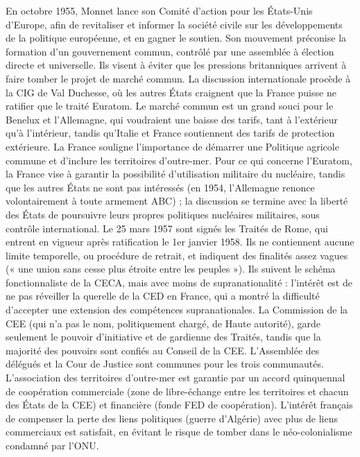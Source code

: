 \documentclass{report}%
\begin{document}
En octobre 1955, Monnet lance son Comité d’action pour les États-Unis d’Europe, afin de revitaliser et informer la société civile sur les développements de la politique européenne, et en gagner le soutien. Son mouvement préconise la formation d’un gouvernement commun, contrôlé par une assemblée à élection directe et universelle. Ils visent à éviter que les pressions britanniques arrivent à faire tomber le projet de marché commun.
La discussion internationale procède à la CIG de Val Duchesse, où les autres États craignent que la France puisse ne ratifier que le traité Euratom. Le marché commun est un grand souci pour le Benelux et l’Allemagne, qui voudraient une baisse des tarifs, tant à l'extérieur qu'à l'intérieur, tandis qu'Italie et France soutiennent des tarifs de protection extérieure. La France souligne l’importance de démarrer une Politique agricole commune et d’inclure les territoires d’outre-mer. Pour ce qui concerne l’Euratom, la France vise à garantir la possibilité d’utilisation militaire du nucléaire, tandis que les autres États ne sont pas intéressés (en 1954, l’Allemagne renonce volontairement à toute armement ABC) ; la discussion se termine avec la liberté des États de poursuivre leurs propres politiques nucléaires militaires, sous contrôle international.
Le 25 mars 1957 sont signés les Traités de Rome, qui entrent en vigueur après ratification le 1er janvier 1958. Ils ne contiennent aucune limite temporelle, ou procédure de retrait, et indiquent des finalités assez vagues (« une union sans cesse plus étroite entre les peuples »). Ils suivent le schéma fonctionnaliste de la CECA, mais avec moins de supranationalité : l’intérêt est de ne pas réveiller la querelle de la CED en France, qui a montré la difficulté d'accepter une extension des compétences supranationales. La Commission de la CEE (qui n’a pas le nom, politiquement chargé, de Haute autorité), garde seulement le pouvoir d’initiative et de gardienne des Traités, tandis que la majorité des pouvoirs sont confiés au Conseil de la CEE. L’Assemblée des délégués et la Cour de Justice sont communes pour les trois communautés.
L’association des territoires d’outre-mer est garantie par un accord quinquennal de coopération commerciale (zone de libre-échange entre les territoires et chacun des États de la CEE) et financière (fonde FED de coopération). L’intérêt français de compenser la perte des liens politiques (guerre d’Algérie) avec plus de liens commerciaux est satisfait, en évitant le risque de tomber dans le néo-colonialisme condamné par l’ONU.
\end{document}
